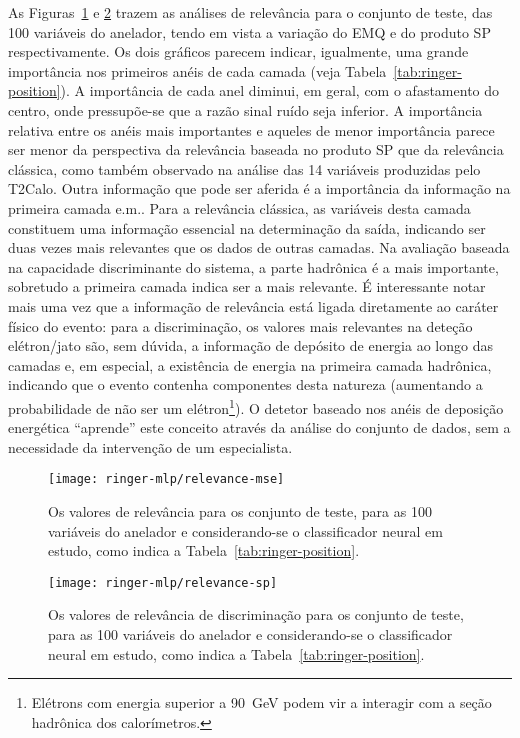 As Figuras~\ref{fig:ringer-mse-relevance} e \ref{fig:ringer-sp-relevance}
trazem as análises de relevância para o conjunto de teste, das 100 variáveis
do anelador, tendo em vista a variação do EMQ e do produto SP
respectivamente. Os dois gráficos parecem indicar, igualmente, uma grande
importância nos primeiros anéis de cada camada (veja
Tabela~\ref{tab:ringer-position}). A importância de cada anel diminui, em
geral, com o afastamento do centro, onde pressupõe-se que a razão sinal ruído
seja inferior. A importância relativa entre os anéis mais importantes e
aqueles de menor importância parece ser menor da perspectiva da relevância
baseada no produto SP que da relevância clássica, como também observado na
análise das 14 variáveis produzidas pelo T2Calo. Outra informação que pode ser
aferida é a importância da informação na primeira camada e.m.. Para a
relevância clássica, as variáveis desta camada constituem uma informação
essencial na determinação da saída, indicando ser duas vezes mais relevantes
que os dados de outras camadas. Na avaliação baseada na capacidade
discriminante do sistema, a parte hadrônica é a mais importante, sobretudo a
primeira camada indica ser a mais relevante. É interessante notar mais uma vez
que a informação de relevância está ligada diretamente ao caráter físico do
evento: para a discriminação, os valores mais relevantes na deteção
elétron/jato são, sem dúvida, a informação de depósito de energia ao longo das
camadas e, em especial, a existência de energia na primeira camada hadrônica,
indicando que o evento contenha componentes desta natureza (aumentando a
probabilidade de não ser um elétron\footnote{Elétrons com energia superior a
90~GeV podem vir a interagir com a seção hadrônica dos calorímetros.}). O
detetor baseado nos anéis de deposição energética ``aprende'' este conceito
através da análise do conjunto de dados, sem a necessidade da intervenção de
um especialista.

\begin{figure}
\begin{center}
\texttt{[image: ringer-mlp/relevance-mse]}
\end{center}
\caption{Os valores de relevância para os conjunto de teste, para as 100
variáveis do anelador e considerando-se o classificador neural em estudo, como
indica a Tabela~\ref{tab:ringer-position}.} 
\label{fig:ringer-mse-relevance}
\end{figure}

\begin{figure}
\begin{center}
\texttt{[image: ringer-mlp/relevance-sp]}
\end{center}
\caption{Os valores de relevância de discriminação para os conjunto de teste,
para as 100 variáveis do anelador e considerando-se o classificador neural em
estudo, como indica a Tabela~\ref{tab:ringer-position}.}
\label{fig:ringer-sp-relevance}
\end{figure}


